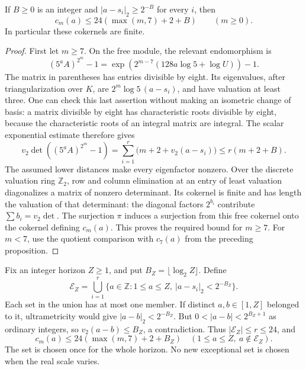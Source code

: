\begin{srproposition}\label{prop:sr-centers}
If \(B\geq0\) is an integer and
\(|a-s_i|_2\geq2^{-B}\) for every \(i\), then
\begin{equation}\label{eq:sr-center-bound}
                  c_m(a)\leq24(\max(m,7)+2+B)
                         \qquad(m\geq0).
\end{equation}
In particular these cokernels are finite.
\end{srproposition}
\begin{proof}
First let \(m\geq7\).
On the free module, the relevant endomorphism is
\[
 (5^aA)^{2^m}-1
 =\exp\left(2^{m-7}(128a\log5+\log U)\right)-1 .
\]
The matrix in parentheses has entries divisible by eight.
Its eigenvalues, after triangularization over \(K\), are
\(2^m\log5\,(a-s_i)\), and have valuation at least three.
One can check this last assertion without making an isometric
change of basis: a matrix divisible by eight has characteristic
roots divisible by eight, because the characteristic roots of
an integral matrix are integral.
The scalar exponential estimate therefore gives
\[
 v_2\det((5^aA)^{2^m}-1)
       =\sum_{i=1}^r\bigl(m+2+v_2(a-s_i)\bigr)
       \leq r(m+2+B).
\]
The assumed lower distances make every eigenfactor nonzero.
Over the discrete valuation ring \(\mathbb Z_2\), row and column
elimination at an entry of least valuation diagonalizes a matrix
of nonzero determinant.
Its cokernel is finite and has length the valuation of that
determinant: the diagonal factors \(2^{b_i}\) contribute
\(\sum b_i=v_2\det\).
The surjection \(\pi\) induces a surjection from this free
cokernel onto the cokernel defining \(c_m(a)\).
This proves the required bound for \(m\geq7\).
For \(m<7\), use the quotient comparison with \(c_7(a)\)
from the preceding proposition.
\end{proof}

Fix an integer horizon \(Z\geq1\), and put
\(B_Z=\lfloor\log_2 Z\rfloor\).
Define
\begin{equation}\label{eq:sr-exception-set}
 \mathcal E_Z=
 \bigcup_{i=1}^r\{a\in\mathbb Z:1\leq a\leq Z,\
                              |a-s_i|_2<2^{-B_Z}\}.
\end{equation}
Each set in the union has at most one member.
If distinct \(a,b\in[1,Z]\) belonged to it, ultrametricity would give
\(|a-b|_2<2^{-B_Z}\).
But \(0<|a-b|<2^{B_Z+1}\) as ordinary integers, so
\(v_2(a-b)\leq B_Z\), a contradiction.
Thus \(|\mathcal E_Z|\leq r\leq24\), and
\begin{equation}\label{eq:sr-outside-exception}
 c_m(a)\leq24(\max(m,7)+2+B_Z)
       \quad(1\leq a\leq Z,\ a\notin\mathcal E_Z).
\end{equation}
The set is chosen once for the whole horizon.
No new exceptional set is chosen when the real scale varies.

